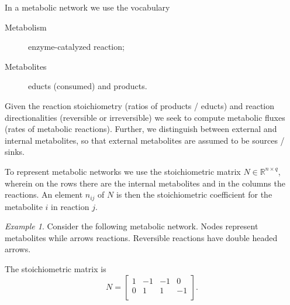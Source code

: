 \documentclass[a4paper]{article}
\theoremstyle{plain}
\theoremstyle{definition}
\theoremstyle{remark}
\newtheorem*{example}{Example}
\begin{document}
In a metabolic network we use the vocabulary
\begin{description}
  \item[Metabolism] enzyme-catalyzed reaction;
  \item[Metabolites] educts (consumed) and products.
\end{description}
Given the reaction stoichiometry (ratios of products / educts) and reaction
directionalities (reversible or irreversible) we seek to compute metabolic
fluxes (rates of metabolic reactions). Further, we distinguish between
external and internal metabolites, so that external metabolites are assumed to
be sources / sinks.

To represent metabolic networks we use the stoichiometric matrix $N \in
\mathbb{R}^{n \times q}$, wherein on the rows there are the internal
metabolites and in the columns the reactions. An element $n_{ij}$ of $N$ is
then the stoichiometric coefficient for the metabolite $i$ in reaction $j$. 

\begin{example} Consider the following metabolic network. Nodes represent
  metabolites while arrows reactions. Reversible reactions have double headed
  arrows.
  \begin{center}
  \end{center}
  The stoichiometric matrix is
  \[
    N = \begin{bmatrix}
      1 & -1 & -1 &  0 \\
      0 &  1 &  1 & -1 \\
    \end{bmatrix}.
  \]
\end{example}
\end{document}
